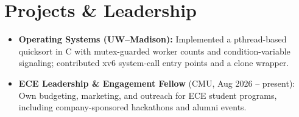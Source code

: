 \documentclass[11pt, letterpaper]{article}
\begin{document}
\section{Projects \& Leadership}
\begin{itemize}
  \item \textbf{Operating Systems (UW--Madison):} Implemented a pthread-based quicksort in C with mutex-guarded worker counts and condition-variable signaling; contributed xv6 system-call entry points and a clone wrapper.
  \item \textbf{ECE Leadership \& Engagement Fellow} (CMU, Aug 2026 -- present): Own budgeting, marketing, and outreach for ECE student programs, including company-sponsored hackathons and alumni events.
\end{itemize}
\end{document}
